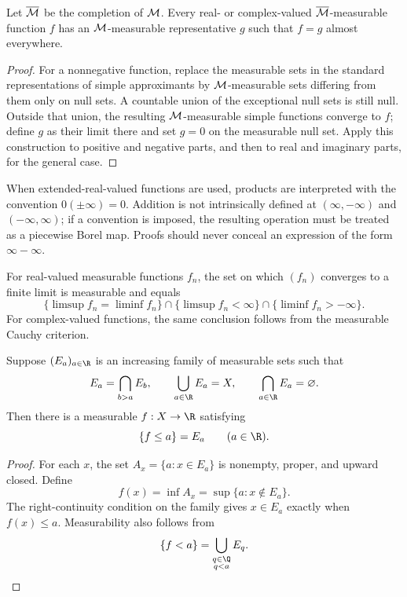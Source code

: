 \begin{prop}
Let $\overline{\mathcal{M}}$ be the completion of $\mathcal{M}$. Every real- or complex-valued $\overline{\mathcal{M}}$-measurable function $f$ has an $\mathcal{M}$-measurable representative $g$ such that $f=g$ almost everywhere.
\end{prop}

\begin{proof}
For a nonnegative function, replace the measurable sets in the standard representations of simple approximants by $\mathcal{M}$-measurable sets differing from them only on null sets. A countable union of the exceptional null sets is still null. Outside that union, the resulting $\mathcal{M}$-measurable simple functions converge to $f$; define $g$ as their limit there and set $g=0$ on the measurable null set. Apply this construction to positive and negative parts, and then to real and imaginary parts, for the general case.
\end{proof}

\begin{remark}
When extended-real-valued functions are used, products are interpreted with the convention $0(\pm\infty)=0$. Addition is not intrinsically defined at $(\infty,-\infty)$ and $(-\infty,\infty)$; if a convention is imposed, the resulting operation must be treated as a piecewise Borel map. Proofs should never conceal an expression of the form $\infty-\infty$.
\end{remark}

\begin{prop}
For real-valued measurable functions $f_n$, the set on which $(f_n)$ converges to a finite limit is measurable and equals
\[
\{\limsup f_n=\liminf f_n\}
\cap\{\limsup f_n<\infty\}
\cap\{\liminf f_n>-\infty\}.
\]
For complex-valued functions, the same conclusion follows from the measurable Cauchy criterion.
\end{prop}

\begin{prop}
Suppose $(E_a)_{a\in\R}$ is an increasing family of measurable sets such that
\[
E_a=\bigcap_{b>a}E_b,
\qquad
\bigcup_{a\in\R}E_a=X,
\qquad
\bigcap_{a\in\R}E_a=\varnothing.
\]
Then there is a measurable $f:X\to\R$ satisfying
\[
\{f\leq a\}=E_a\qquad(a\in\R).
\]
\end{prop}

\begin{proof}
For each $x$, the set $A_x=\{a:x\in E_a\}$ is nonempty, proper, and upward closed. Define
\[
f(x)=\inf A_x=\sup\{a:x\notin E_a\}.
\]
The right-continuity condition on the family gives $x\in E_a$ exactly when $f(x)\leq a$. Measurability also follows from
\[
\{f<a\}=\bigcup_{\substack{q\in\Q\\q<a}}E_q.
\]
\end{proof}

